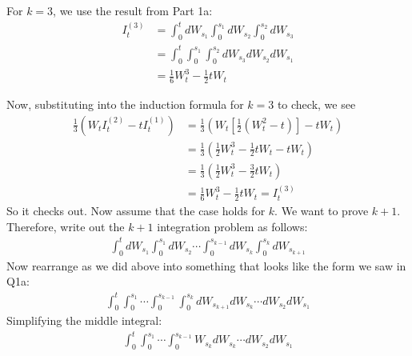 \documentclass[12pt]{article}
\theoremstyle{plain}
\theoremstyle{definition}
\theoremstyle{remark}
\begin{document}
\begin{enumerate}
\begin{enumerate}
        For $k=3$, we use the result from Part 1a:
        \begin{align*}
          I^{(3)}_t
          &= \int^t_0 dW_{s_1} \int^{s_1}_0 dW_{s_2} \int^{s_2}_0 dW_{s_3}\\
          &=\int^t_0\int^{s_1}_0\int^{s_2}_0 dW_{s_3} dW_{s_2} dW_{s_1} \\
          &= \frac{1}{6} W_t^3 - \frac{1}{2} tW_t
        \end{align*}

        Now, substituting into the induction formula for $k=3$ to check,
        we see
        \begin{align*}
          \frac{1}{3}\left(W_t I^{(2)}_t - tI^{(1)}_t\right)
          &=
          \frac{1}{3}\left(W_t \left[ \frac{1}{2}(W_t^2 - t)\right]
              - tW_t\right)\\
          &=
          \frac{1}{3}\left( \frac{1}{2}W_t^3 - \frac{1}{2}tW_t
              - tW_t\right)\\
          &=
          \frac{1}{3}\left( \frac{1}{2}W_t^3 - \frac{3}{2}tW_t\right)\\
          &=
          \frac{1}{6}W_t^3 - \frac{1}{2}tW_t
          = I^{(3)}_t
        \end{align*}
        So it checks out. Now assume that the case holds for $k$. We
        want to prove $k+1$. Therefore, write out the $k+1$ integration
        problem as follows:
        \begin{align*}
          \int^t_0 dW_{s_1} \int^{s_1}_0 dW_{s_2}
          \cdots \int^{s_{k-1}}_0 dW_{s_{k}}
          \int^{s_k}_0 dW_{s_{k+1}}
        \end{align*}
        Now rearrange as we did above into something that looks like the
        form we saw in Q1a:
        \begin{align*}
          \int^t_0 \int^{s_1}_0 \cdots \int^{s_{k-1}}_0
          \int^{s_k}_0 dW_{s_{k+1}} dW_{s_{k}}\cdots
          dW_{s_2}dW_{s_1}
        \end{align*}
        Simplifying the middle integral:
        \begin{align*}
          \int^t_0 \int^{s_1}_0 \cdots \int^{s_{k-1}}_0
          W_{s_{k}}dW_{s_{k}}\cdots
          dW_{s_2}dW_{s_1}
        \end{align*}

    \end{enumerate}


\end{enumerate}
\end{document}
